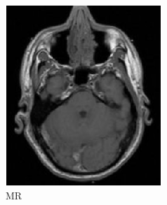 \documentclass[10pt,twoside]{book}
\begin{document}
\begin{figure}
  \centering
  \begin{subfigure}{0.4\textwidth}
     \centering
     \includegraphics[width=\textwidth]{snapshot_plots__doInterModality_1__doMutualInformation_1__xOffset_0_MR}
     \caption{MR}
     \label{fig:registration_MR}
  \end{subfigure}
  \hfill
  \begin{subfigure}{0.4\textwidth}
     \centering

\end{subfigure}
\end{figure}
\end{document}
